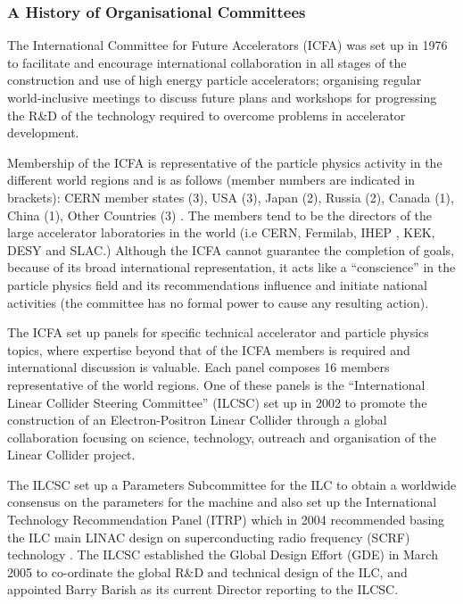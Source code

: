 \subsubsection{A History of Organisational Committees}

The International Committee for Future Accelerators (ICFA) was set up in 1976 to facilitate and encourage international collaboration in all stages of the construction and use of high energy particle accelerators; organising regular world-inclusive meetings to discuss future plans and workshops for progressing the R\&D of the technology required to overcome problems in accelerator development. \cite{ICFA}

Membership of the ICFA is representative of the particle physics activity in the different world regions and is as follows (member numbers are indicated in brackets): CERN member states (3), USA (3), Japan (2), Russia (2), Canada (1), China (1), Other Countries (3) \cite{ICFA}. The members tend to be the directors of the large accelerator laboratories in the world (i.e CERN, Fermilab, IHEP , KEK, DESY and SLAC.) Although the ICFA cannot guarantee the completion of goals, because of its broad international representation, it acts like a ``conscience'' in the particle physics field and its recommendations influence and initiate national activities (the committee has no formal power to cause any resulting action). \cite{ICFA}

The ICFA set up panels for specific technical accelerator and particle physics topics, where expertise beyond that of the ICFA members is required and international discussion is valuable. Each panel composes 16 members representative of the world regions. One of these panels is the ``International Linear Collider Steering Committee'' (ILCSC) set up in 2002 to promote the construction of an Electron-Positron Linear Collider through a global collaboration focusing on science, technology, outreach and organisation of the Linear Collider project. \cite{ICFA}

The ILCSC set up a Parameters Subcommittee for the ILC to obtain a worldwide consensus on the parameters for the machine and also set up the International Technology Recommendation Panel (ITRP) which in 2004 recommended basing the ILC main LINAC design on superconducting radio frequency (SCRF) technology \cite{Funding:Interactions:ICFAPress}. The ILCSC established the Global Design Effort (GDE) in March 2005 to co-ordinate the global R\&D and technical design of the ILC, and appointed Barry Barish as its current Director reporting to the ILCSC.

